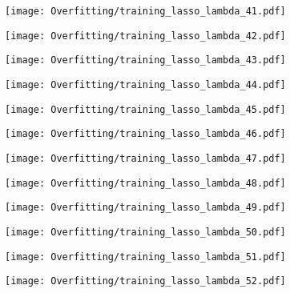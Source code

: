 \documentclass[xcolor=pdftex,dvipsnames,table]{beamer}
\begin{document}
\frame
{
	\begin{center}
		\texttt{[image: Overfitting/training\_lasso\_lambda\_41.pdf]}
	\end{center}
}

\frame
{
	\begin{center}
		\texttt{[image: Overfitting/training\_lasso\_lambda\_42.pdf]}
	\end{center}
}

\frame
{
	\begin{center}
		\texttt{[image: Overfitting/training\_lasso\_lambda\_43.pdf]}
	\end{center}
}

\frame
{
	\begin{center}
		\texttt{[image: Overfitting/training\_lasso\_lambda\_44.pdf]}
	\end{center}
}

\frame
{
	\begin{center}
		\texttt{[image: Overfitting/training\_lasso\_lambda\_45.pdf]}
	\end{center}
}

\frame
{
	\begin{center}
		\texttt{[image: Overfitting/training\_lasso\_lambda\_46.pdf]}
	\end{center}
}

\frame
{
	\begin{center}
		\texttt{[image: Overfitting/training\_lasso\_lambda\_47.pdf]}
	\end{center}
}

\frame
{
	\begin{center}
		\texttt{[image: Overfitting/training\_lasso\_lambda\_48.pdf]}
	\end{center}
}

\frame
{
	\begin{center}
		\texttt{[image: Overfitting/training\_lasso\_lambda\_49.pdf]}
	\end{center}
}

\frame
{
	\begin{center}
		\texttt{[image: Overfitting/training\_lasso\_lambda\_50.pdf]}
	\end{center}
}

\frame
{
	\begin{center}
		\texttt{[image: Overfitting/training\_lasso\_lambda\_51.pdf]}
	\end{center}
}

\frame
{
	\begin{center}
		\texttt{[image: Overfitting/training\_lasso\_lambda\_52.pdf]}
	\end{center}
}
\end{document}
